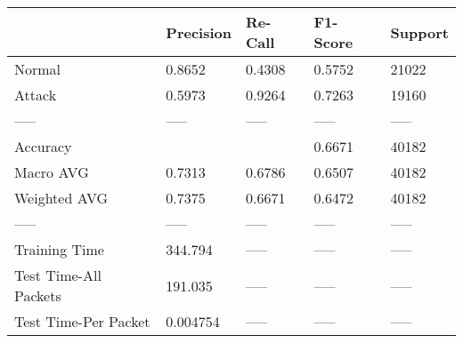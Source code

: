 \begin{tabular}{lllll}
\toprule
{} & Precision & Re-Call & F1-Score & Support \\
\midrule
Normal                &    0.8652 &  0.4308 &   0.5752 &   21022 \\
Attack                &    0.5973 &  0.9264 &   0.7263 &   19160 \\
-----                 &     ----- &   ----- &    ----- &   ----- \\
Accuracy              &           &         &   0.6671 &   40182 \\
Macro AVG             &    0.7313 &  0.6786 &   0.6507 &   40182 \\
Weighted AVG          &    0.7375 &  0.6671 &   0.6472 &   40182 \\
-----                 &     ----- &   ----- &    ----- &   ----- \\
Training Time         &   344.794 &   ----- &    ----- &   ----- \\
Test Time-All Packets &   191.035 &   ----- &    ----- &   ----- \\
Test Time-Per Packet  &  0.004754 &   ----- &    ----- &   ----- \\
\bottomrule
\end{tabular}
